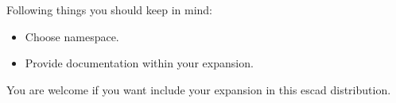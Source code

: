 \documentclass[a4paper, 12pt, openany]{scrbook}
\begin{document}
Following things you should keep in mind:
\begin{itemize}
\item Choose namespace.
\item Provide documentation within your expansion.
\end{itemize}
You are welcome if you want include your expansion in this escad distribution.

\clearpage %

% 
\printindex

\setlength{\bibitemsep}{1em} %
\printbibliography[heading=bibintoc] %
\end{document}
